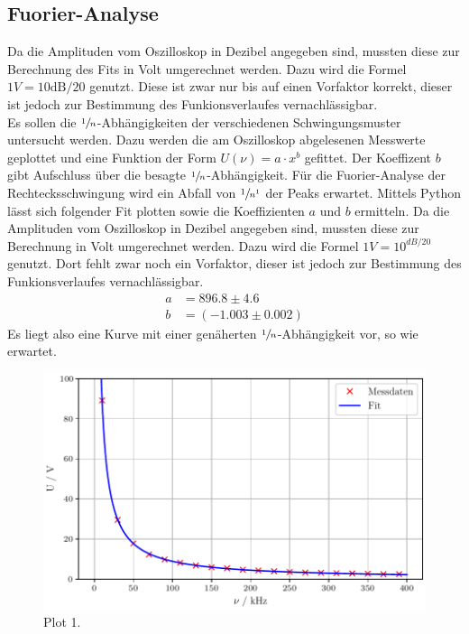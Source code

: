 \subsection{Fuorier-Analyse}
Da die Amplituden vom Oszilloskop in Dezibel angegeben sind, mussten diese zur Berechnung des Fits in Volt umgerechnet werden.
Dazu wird die Formel $1V=10{\text{dB}/20}$ genutzt. Diese ist zwar nur bis auf einen Vorfaktor korrekt, dieser ist jedoch zur Bestimmung
des Funkionsverlaufes vernachlässigbar.\\
Es sollen die $\sfrac{1}{n}$-Abhängigkeiten der verschiedenen Schwingungsmuster untersucht werden. Dazu werden die am Oszilloskop 
abgelesenen Messwerte geplottet und eine Funktion der Form $U(\nu)=a\cdot x^b$ gefittet. Der Koeffizent $b$ gibt Aufschluss über die 
besagte $\sfrac{1}{n}$-Abhängigkeit. Für die Fuorier-Analyse der Rechtecksschwingung wird ein Abfall von $\sfrac{1}{n^1}$ der Peaks
erwartet.
Mittels Python lässt sich folgender Fit plotten sowie die Koeffizienten $a$ und $b$ ermitteln.
Da die Amplituden vom Oszilloskop in Dezibel angegeben sind, mussten diese zur Berechnung in Volt umgerechnet werden.
Dazu wird die Formel $1V=10^{\si{dB}/20}$ genutzt. Dort fehlt zwar noch ein Vorfaktor, dieser ist jedoch zur Bestimmung
des Funkionsverlaufes vernachlässigbar. 
\begin{align*}
  a &= \si{896.8 ± 4.6}\\
  b &= (-1.003 ± 0.002)
\end{align*}
Es liegt also eine Kurve mit einer genäherten $\sfrac{1}{n}$-Abhängigkeit vor, so wie erwartet.
\begin{figure}[H]
  \centering
  \includegraphics[scale=0.6]{plota.pdf}
  \caption{Plot 1.}
  \label{fig:Plot1}
\end{figure}\noindent
